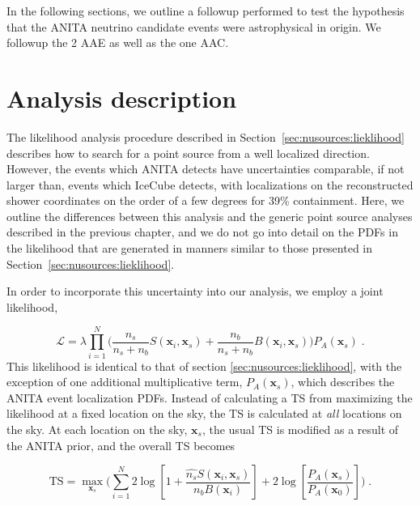 In the following sections, we outline a followup performed to test the hypothesis that the ANITA neutrino candidate events were astrophysical in origin. We followup the 2 AAE as well as the one AAC. 

\section{Analysis description}
\label{sec:ANITA:analysis}

The likelihood analysis procedure described in Section~\ref{sec:nusources:lieklihood} describes how to search for a point source from a well localized direction. However, the events which ANITA detects have uncertainties comparable, if not larger than, events which IceCube detects, with localizations on the reconstructed shower coordinates on the order of a few degrees for 39\% containment. Here, we outline the differences between this analysis and the generic point source analyses described in the previous chapter, and we do not go into detail on the PDFs in the likelihood that are generated in manners similar to those presented in Section~\ref{sec:nusources:lieklihood}. 

In order to incorporate this uncertainty into our analysis, we employ a joint likelihood,

\begin{equation}
\label{eq:joint_likelihood}
     \mathcal{L} = \lambda \prod_{i=1}^{N} \Bigg( \frac{n_s}{n_s + n_b}S(\mathbf{x}_i, \mathbf{x}_s)  + \frac{n_b}{n_s + n_b}B(\mathbf{x}_i, \mathbf{x}_s) \Bigg) P_A(\mathbf{x}_s) \; .
\end{equation}
This likelihood is identical to that of section \ref{sec:nusources:lieklihood}, with the exception of one additional multiplicative term, $P_A(\mathbf{x}_s)$, which describes the ANITA event localization PDFs. Instead of calculating a TS from maximizing the likelihood at a fixed location on the sky, the TS is calculated at \textit{all} locations on the sky. At each location on the sky, $\mathbf{x}_s$, the usual TS is modified as a result of the ANITA prior, and the overall TS becomes

\begin{equation}
    \label{eq:TS_spatial_prior}
    \text{TS} = \max_{\mathbf{x}_s} \Bigg( \sum_{i=1}^{N}2\log \left[ 1 + \frac{\hat{n_s} S(\mathbf{x}_i, \mathbf{x}_s)}{n_b B(\mathbf{x}_i)} \right] + 2 \log \left[ \frac{P_A (\mathbf{x}_s)}{P_A (\mathbf{x}_0)} \right] \Bigg)\; .
\end{equation}

